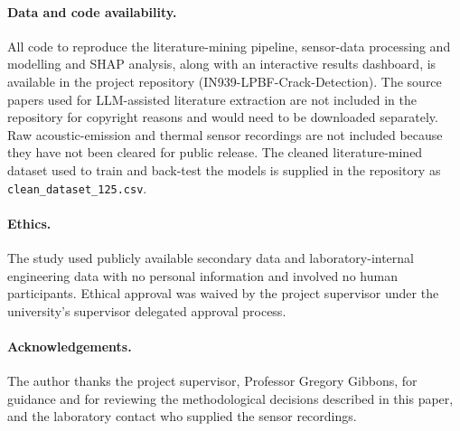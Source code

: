 \documentclass[a4paper]{article}
\begin{document}
\paragraph{Data and code availability.} All code to reproduce the literature-mining pipeline, sensor-data processing and modelling and SHAP analysis, along with an interactive results dashboard, is available in the project repository (IN939-LPBF-Crack-Detection). The source papers used for LLM-assisted literature extraction are not included in the repository for copyright reasons and would need to be downloaded separately. Raw acoustic-emission and thermal sensor recordings are not included because they have not been cleared for public release. The cleaned literature-mined dataset used to train and back-test the models is supplied in the repository as \texttt{clean\_dataset\_125.csv}.

\paragraph{Ethics.} The study used publicly available secondary data and laboratory-internal engineering data with no personal information and involved no human participants. Ethical approval was waived by the project supervisor under the university's supervisor delegated approval process.

\paragraph{Acknowledgements.} The author thanks the project supervisor, Professor Gregory Gibbons, for guidance and for reviewing the methodological decisions described in this paper, and the laboratory contact who supplied the sensor recordings.
\end{document}
